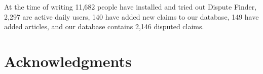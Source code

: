 \documentclass{www2010-submission}
\newcommand{\todo}[1]{}
\begin{document}
At the time of writing 11,682 people have installed and tried out Dispute Finder, 2,297 are active daily users, 140 have added new claims to our database, 149 have added articles, and our database contains 2,146 disputed claims. 

\todo{Add count of disputed claims}

\section{Acknowledgments}

\todo{Do we want to have acknowledgements}


\todo{Sort out bad references}

\end{document}
